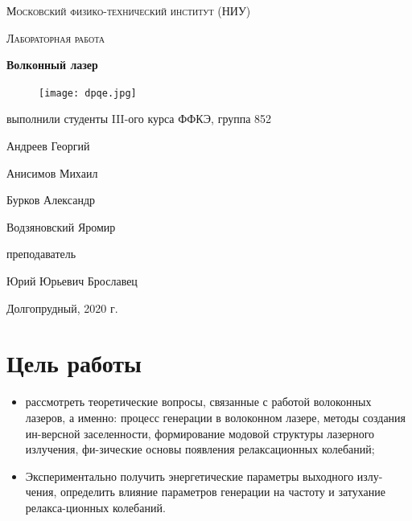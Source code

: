 \documentclass[a4paper]{article}
\begin{document}
\begin{titlepage}
\noindent

	\centering
	\vspace{2cm}
	{\scshape\LARGE Московский физико-технический институт (НИУ)\par}
	\vspace{1cm}
	{\scshape\Large Лабораторная работа\par}
	\vspace{1cm}
	{\huge\bfseries Волконный лазер\par}
	\vspace{1cm}
	
	\begin{figure}[H]
	\centering
	\texttt{[image: dpqe.jpg]}
   	\label{fig:0}
	\end{figure}
	\vfill
	
\begin{flushright}
	{\large выполнили студенты III-ого курса ФФКЭ, группа 852}\par
	\vspace{0.3cm}
	{\LARGE Андреев Георгий} \par
	{\LARGE Анисимов Михаил} \par
	{\LARGE Бурков Александр} \par
	{\LARGE Водзяновский Яромир} \par
	\vspace{0.3cm}
	{\large преподаватель}\par
	\vspace{0.3cm}
	{\LARGE Юрий Юрьевич Брославец} \par
\end{flushright}

\vfill

	Долгопрудный, 2020 г.
\end{titlepage}
\newpage
\tableofcontents
\newpage
\section{Цель работы}
\begin{itemize}
	\item рассмотреть теоретические вопросы, связанные с работой волоконных лазеров, а именно: процесс генерации в волоконном лазере, методы создания ин-версной заселенности, формирование модовой структуры лазерного излучения, фи-зические основы появления релаксационных колебаний;
	\item Экспериментально получить энергетические параметры выходного излу-чения, определить влияние параметров генерации на частоту и затухание релакса-ционных колебаний.
\end{itemize}
\end{document}
